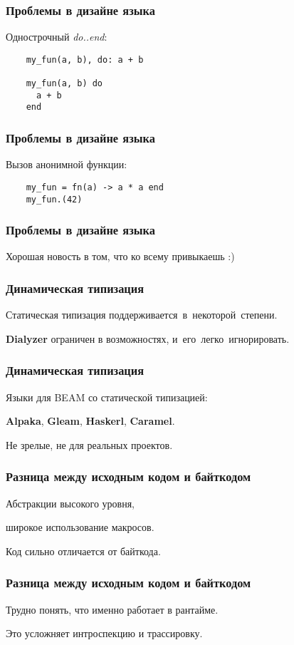 \documentclass[10pt]{beamer}
\begin{document}
\begin{frame}[fragile]
  \frametitle{Проблемы в дизайне языка}
  Однострочный \textit{do..end}:
  \begin{lstlisting}
    my_fun(a, b), do: a + b
    
    my_fun(a, b) do
      a + b
    end
  \end{lstlisting}
\end{frame}

\begin{frame}[fragile]
  \frametitle{Проблемы в дизайне языка}
  Вызов анонимной функции:
  \begin{lstlisting}
    my_fun = fn(a) -> a * a end 
    my_fun.(42)
  \end{lstlisting}
\end{frame}

\begin{frame}
  \frametitle{Проблемы в дизайне языка}
  Хорошая новость в том, что ко всему привыкаешь :)
\end{frame}

\begin{frame}
  \frametitle{Динамическая типизация}
  Статическая типизация поддерживается~в~некоторой~степени.
  \par \bigskip
  \textbf{Dialyzer} ограничен в возможностях, и~его~легко~игнорировать.
\end{frame}

\begin{frame}
  \frametitle{Динамическая типизация}
  Языки для BEAM со статической типизацией:
  \par \bigskip
  \textbf{Alpaka}, \textbf{Gleam}, \textbf{Haskerl}, \textbf{Caramel}.
  \par \bigskip
  Не зрелые, не для реальных проектов.
\end{frame}

\begin{frame}
  \frametitle{Разница между исходным кодом и байткодом}
  Абстракции высокого уровня,
  \par \bigskip
  широкое использование макросов.
  \par \bigskip
  Код сильно отличается от байткода.
\end{frame}

\begin{frame}
  \frametitle{Разница между исходным кодом и байткодом}
  Трудно понять, что именно работает в рантайме.
  \par \bigskip
  Это усложняет интроспекцию и трассировку.
\end{frame}
\end{document}
